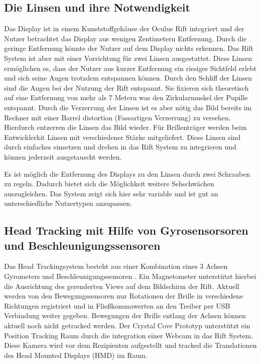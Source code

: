 \documentclass[pagesize, paper=a4, fontsize=12pt,titlepage=true, headings=small, headnosepline, abstractoff, liststotoc, nochapterprefix, plainheadsepline]{scrreprt}
\begin{document}
\subsection{Die Linsen und ihre Notwendigkeit}
Das Display ist in einem Kunststoffgehäuse der Oculus Rift integriert und der Nutzer betrachtet das Display aus wenigen Zentimetern Entfernung. Durch die geringe Entfernung könnte der Nutzer auf dem Display nichts erkennen. Das Rift System ist aber mit einer Vorrichtung für zwei Linsen ausgestattet. Diese Linsen ermöglichen es, dass der Nutzer aus kurzer Entfernung ein riesiges Sichtfeld erlebt und sich seine Augen trotzdem entspannen können. Durch den Schliff der Linsen sind die Augen bei der Nutzung der Rift entspannt. Sie fixieren sich theoretisch auf eine Entfernung von mehr als 7 Metern was den Zirkularmuskel der Pupille entspannt. Durch die Verzerrung der Linsen ist es aber nötig das Bild bereits im Rechner mit einer Barrel distortion (Fassartigen Verzerrung) zu versehen. Hierdurch entzerren die Linsen das Bild wieder. Für Brillenträger werden beim Entwicklerkit Linsen mit verschiedener Stärke mitgeliefert. Diese Linsen sind durch einfaches einsetzen und drehen in das Rift System zu integrieren und können jederzeit ausgetauscht werden.

Es ist möglich die Entfernung des Displays zu den Linsen durch zwei Schrauben zu regeln. Dadurch bietet sich die Möglichkeit weitere Sehschwächen auszugleichen. Das System zeigt sich hier sehr variable und ist gut an unterschiedliche Nutzertypen anzupassen.

\subsection{Head Tracking mit Hilfe von Gyrosensorsoren  und Beschleunigungssensoren}
Das Head Trackingsystem besteht aus einer Kombination eines 3 Achsen Gyrometers und Beschleunigungssensoren . Ein Magnetometer unterstützt hierbei die Ausrichtung des gerenderten Views auf dem Bildschirm der Rift. Aktuell werden von den Bewegungssensoren nur Rotationen der Brille in verschiedene Richtungen registriert und in Fließkommawerten an den Treiber per USB Verbindung weiter gegeben. Bewegungen der Brille entlang der Achsen können aktuell noch nicht getracked werden. Der Crystal Cove Prototyp unterstützt ein Position Tracking Raum durch die integration einer Webcam in das Rift System. Diese Kamera wird vor dem Rezipienten aufgestellt und tracked die Translationen des Head Mounted Displays (HMD) im Raum.
\end{document}
